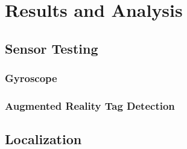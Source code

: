 \chapter{Results and Analysis\label{ch:results}}

\section{Sensor Testing}

	\subsection{Gyroscope}

	\subsection{Augmented Reality Tag Detection}

\section{Localization}
